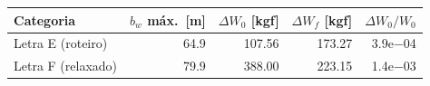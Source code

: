 \begin{tabular}{lrrrr}
\toprule
Categoria & $b_w$ máx.\ [m] & $\Delta W_0$ [kgf] & $\Delta W_f$ [kgf] & $\Delta W_0/W_0$ \\
\midrule
Letra E (roteiro) & 64.9 & 107.56 & 173.27 & 3.9e$-$04 \\
Letra F (relaxado) & 79.9 & 388.00 & 223.15 & 1.4e$-$03 \\
\bottomrule
\end{tabular}